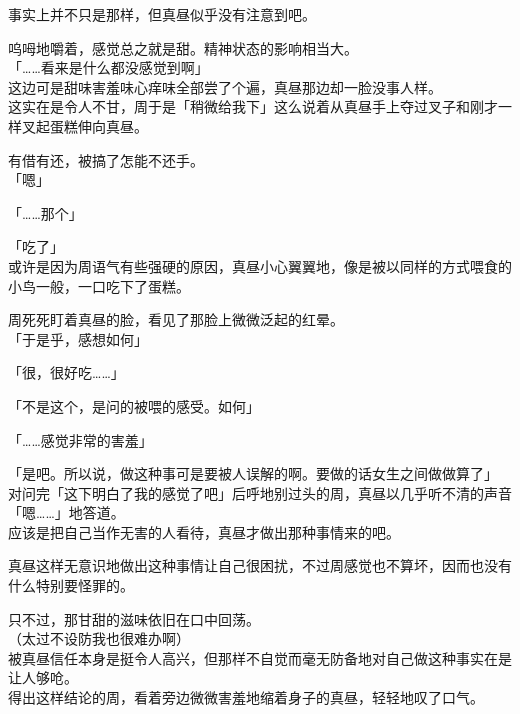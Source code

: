 事实上并不只是那样，但真昼似乎没有注意到吧。

呜呣地嚼着，感觉总之就是甜。精神状态的影响相当大。\\

「……看来是什么都没感觉到啊」\\

这边可是甜味害羞味心痒味全部尝了个遍，真昼那边却一脸没事人样。\\

这实在是令人不甘，周于是「稍微给我下」这么说着从真昼手上夺过叉子和刚才一样叉起蛋糕伸向真昼。

有借有还，被搞了怎能不还手。\\

「嗯」

「……那个」

「吃了」\\

或许是因为周语气有些强硬的原因，真昼小心翼翼地，像是被以同样的方式喂食的小鸟一般，一口吃下了蛋糕。

周死死盯着真昼的脸，看见了那脸上微微泛起的红晕。\\

「于是乎，感想如何」

「很，很好吃……」

「不是这个，是问的被喂的感受。如何」

「……感觉非常的害羞」

「是吧。所以说，做这种事可是要被人误解的啊。要做的话女生之间做做算了」\\

对问完「这下明白了我的感觉了吧」后呼地别过头的周，真昼以几乎听不清的声音「嗯……」地答道。\\

应该是把自己当作无害的人看待，真昼才做出那种事情来的吧。

真昼这样无意识地做出这种事情让自己很困扰，不过周感觉也不算坏，因而也没有什么特别要怪罪的。

只不过，那甘甜的滋味依旧在口中回荡。\\

（太过不设防我也很难办啊）\\

被真昼信任本身是挺令人高兴，但那样不自觉而毫无防备地对自己做这种事实在是让人够呛。\\

得出这样结论的周，看着旁边微微害羞地缩着身子的真昼，轻轻地叹了口气。

